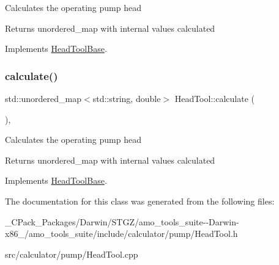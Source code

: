Calculates the operating pump head

\begin{DoxyReturn}{Returns}
unordered\+\_\+map with internal values calculated 
\end{DoxyReturn}


Implements \hyperlink{class_head_tool_base_ab8df8f908827ce45dc5e769ea0e10f0b}{Head\+Tool\+Base}.

\mbox{\label{class_head_tool_a146eaf45d39cf6d691fa10b4b80b5e9e}} 
\subsubsection{\texorpdfstring{calculate()}{calculate()}\hspace{0.1cm}{\footnotesize\ttfamily [3/3]}}
{\footnotesize\ttfamily std\+::unordered\+\_\+map$<$std\+::string, double$>$ Head\+Tool\+::calculate (\begin{DoxyParamCaption}{ }\end{DoxyParamCaption})\hspace{0.3cm}{\ttfamily [override]}, {\ttfamily [virtual]}}

Calculates the operating pump head

\begin{DoxyReturn}{Returns}
unordered\+\_\+map with internal values calculated 
\end{DoxyReturn}


Implements \hyperlink{class_head_tool_base_ab8df8f908827ce45dc5e769ea0e10f0b}{Head\+Tool\+Base}.



The documentation for this class was generated from the following files\+:\begin{DoxyCompactItemize}
\item 
\+\_\+\+C\+Pack\+\_\+\+Packages/\+Darwin/\+S\+T\+G\+Z/amo\+\_\+tools\+\_\+suite-\/-\/\+Darwin-\/x86\+\_/amo\+\_\+tools\+\_\+suite/include/calculator/pump/Head\+Tool.\+h\item 
src/calculator/pump/Head\+Tool.\+cpp\end{DoxyCompactItemize}
